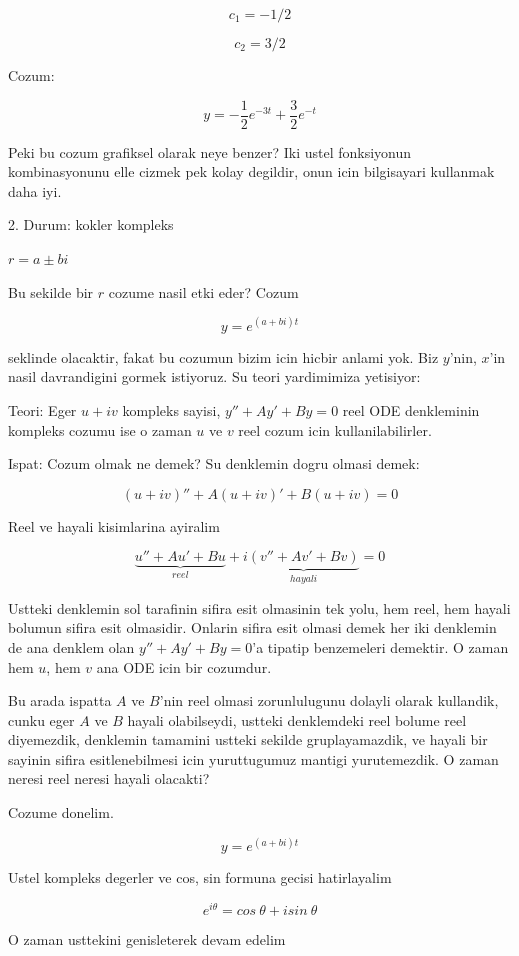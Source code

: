 \documentclass[12pt,fleqn]{article}
\begin{document}
\[ c_1 = -1/2 \]

\[ c_2 = 3/2 \]

Cozum: 

\[ y = -\frac{1}{2}e^{-3t} + \frac{3}{2}e^{-t} \]

Peki bu cozum grafiksel olarak neye benzer? Iki ustel fonksiyonun
kombinasyonunu elle cizmek pek kolay degildir, onun icin bilgisayari
kullanmak daha iyi. 

2. Durum: kokler kompleks 

$r = a \pm bi$

Bu sekilde bir $r$ cozume nasil etki eder? Cozum

\[ y = e^{(a+bi)t} \] 

seklinde olacaktir, fakat bu cozumun bizim icin hicbir anlami yok. Biz
$y$'nin, $x$'in nasil davrandigini gormek istiyoruz. Su teori yardimimiza
yetisiyor: 

Teori: Eger $u + iv$ kompleks sayisi, $y'' + Ay' + By = 0$ reel ODE
denkleminin kompleks cozumu ise o zaman $u$ ve $v$ reel cozum icin
kullanilabilirler.

Ispat: Cozum olmak ne demek? Su denklemin dogru olmasi demek: 

\[ (u+iv)'' + A(u+iv)' + B(u+iv) = 0\]

Reel ve hayali kisimlarina ayiralim

\[ 
\underbrace{u'' + Au' + Bu}_{reel} + 
i\underbrace{(v'' + Av' + Bv)}_{hayali} = 0
\]

Ustteki denklemin sol tarafinin sifira esit olmasinin tek yolu, hem reel,
hem hayali bolumun sifira esit olmasidir. Onlarin sifira esit olmasi demek
her iki denklemin de ana denklem olan $y'' + Ay' + By = 0$'a tipatip
benzemeleri demektir. O zaman hem $u$, hem $v$ ana ODE icin bir cozumdur. 

Bu arada ispatta $A$ ve $B$'nin reel olmasi zorunlulugunu dolayli olarak
kullandik, cunku eger $A$ ve $B$ hayali olabilseydi, ustteki denklemdeki
reel bolume reel diyemezdik, denklemin tamamini ustteki sekilde
gruplayamazdik, ve hayali bir sayinin sifira esitlenebilmesi icin
yuruttugumuz mantigi yurutemezdik. O zaman neresi reel neresi hayali
olacakti? 

Cozume donelim. 

\[ y = e^{(a+bi)t} \] 

Ustel kompleks degerler ve cos, sin formuna gecisi hatirlayalim

\[ e^{i\theta} = cos \ \theta + isin \ \theta \]

O zaman usttekini genisleterek devam edelim
\end{document}
